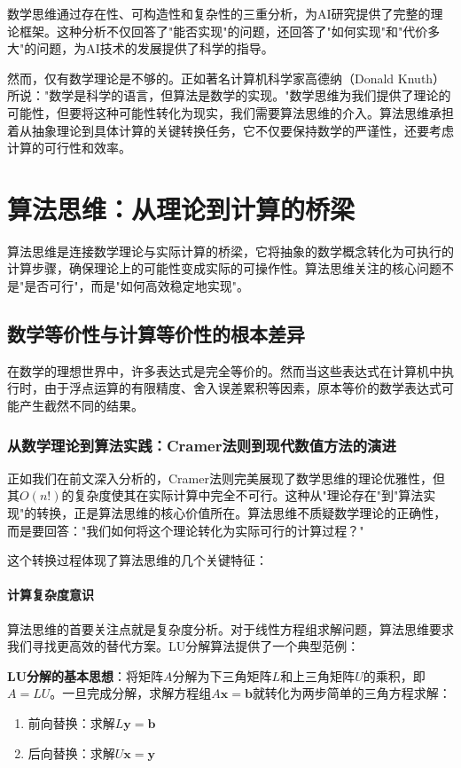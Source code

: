 数学思维通过存在性、可构造性和复杂性的三重分析，为AI研究提供了完整的理论框架。这种分析不仅回答了"能否实现"的问题，还回答了"如何实现"和"代价多大"的问题，为AI技术的发展提供了科学的指导。

然而，仅有数学理论是不够的。正如著名计算机科学家高德纳（Donald Knuth）所说："数学是科学的语言，但算法是数学的实现。"数学思维为我们提供了理论的可能性，但要将这种可能性转化为现实，我们需要算法思维的介入。算法思维承担着从抽象理论到具体计算的关键转换任务，它不仅要保持数学的严谨性，还要考虑计算的可行性和效率。

\section{算法思维：从理论到计算的桥梁}

算法思维是连接数学理论与实际计算的桥梁，它将抽象的数学概念转化为可执行的计算步骤，确保理论上的可能性变成实际的可操作性。算法思维关注的核心问题不是"是否可行"，而是"如何高效稳定地实现"。

\subsection{数学等价性与计算等价性的根本差异}

在数学的理想世界中，许多表达式是完全等价的。然而当这些表达式在计算机中执行时，由于浮点运算的有限精度、舍入误差累积等因素，原本等价的数学表达式可能产生截然不同的结果。

\subsubsection{从数学理论到算法实践：Cramer法则到现代数值方法的演进}

正如我们在前文深入分析的，Cramer法则完美展现了数学思维的理论优雅性，但其$O(n!)$的复杂度使其在实际计算中完全不可行。这种从"理论存在"到"算法实现"的转换，正是算法思维的核心价值所在。算法思维不质疑数学理论的正确性，而是要回答："我们如何将这个理论转化为实际可行的计算过程？"

这个转换过程体现了算法思维的几个关键特征：

\paragraph{计算复杂度意识}
算法思维的首要关注点就是复杂度分析。对于线性方程组求解问题，算法思维要求我们寻找更高效的替代方案。LU分解算法提供了一个典型范例：

\textbf{LU分解的基本思想}：将矩阵$A$分解为下三角矩阵$L$和上三角矩阵$U$的乘积，即$A = LU$。一旦完成分解，求解方程组$A\mathbf{x} = \mathbf{b}$就转化为两步简单的三角方程求解：
\begin{enumerate}
\item 前向替换：求解$L\mathbf{y} = \mathbf{b}$
\item 后向替换：求解$U\mathbf{x} = \mathbf{y}$
\end{enumerate}


